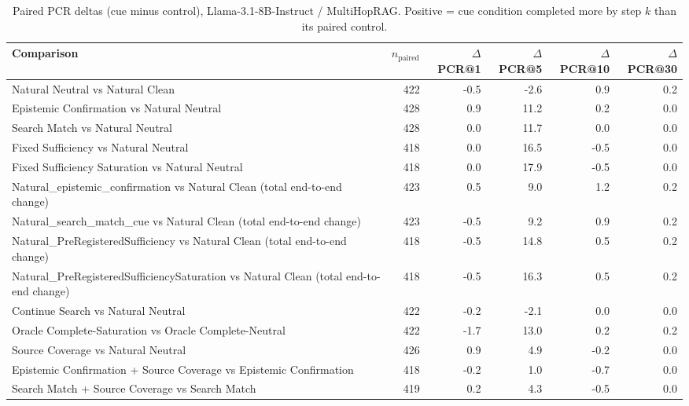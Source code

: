 \begin{table}[t]
\centering
\caption{Paired PCR deltas (cue minus control), Llama-3.1-8B-Instruct / MultiHopRAG. Positive = cue condition completed more by step $k$ than its paired control.}
\begin{tabular}{lrrrrr}
\toprule
Comparison & $n_{\text{paired}}$ & $\Delta$PCR@1 & $\Delta$PCR@5 & $\Delta$PCR@10 & $\Delta$PCR@30 \\
\midrule
Natural Neutral vs Natural Clean & 422 & -0.5 & -2.6 & 0.9 & 0.2 \\
Epistemic Confirmation vs Natural Neutral & 428 & 0.9 & 11.2 & 0.2 & 0.0 \\
Search Match vs Natural Neutral & 428 & 0.0 & 11.7 & 0.0 & 0.0 \\
Fixed Sufficiency vs Natural Neutral & 418 & 0.0 & 16.5 & -0.5 & 0.0 \\
Fixed Sufficiency Saturation vs Natural Neutral & 418 & 0.0 & 17.9 & -0.5 & 0.0 \\
Natural\_epistemic\_confirmation vs Natural Clean (total end-to-end change) & 423 & 0.5 & 9.0 & 1.2 & 0.2 \\
Natural\_search\_match\_cue vs Natural Clean (total end-to-end change) & 423 & -0.5 & 9.2 & 0.9 & 0.2 \\
Natural\_PreRegisteredSufficiency vs Natural Clean (total end-to-end change) & 418 & -0.5 & 14.8 & 0.5 & 0.2 \\
Natural\_PreRegisteredSufficiencySaturation vs Natural Clean (total end-to-end change) & 418 & -0.5 & 16.3 & 0.5 & 0.2 \\
Continue Search vs Natural Neutral & 422 & -0.2 & -2.1 & 0.0 & 0.0 \\
Oracle Complete-Saturation vs Oracle Complete-Neutral & 422 & -1.7 & 13.0 & 0.2 & 0.2 \\
Source Coverage vs Natural Neutral & 426 & 0.9 & 4.9 & -0.2 & 0.0 \\
Epistemic Confirmation + Source Coverage vs Epistemic Confirmation & 418 & -0.2 & 1.0 & -0.7 & 0.0 \\
Search Match + Source Coverage vs Search Match & 419 & 0.2 & 4.3 & -0.5 & 0.0 \\
\bottomrule
\end{tabular}
\end{table}
